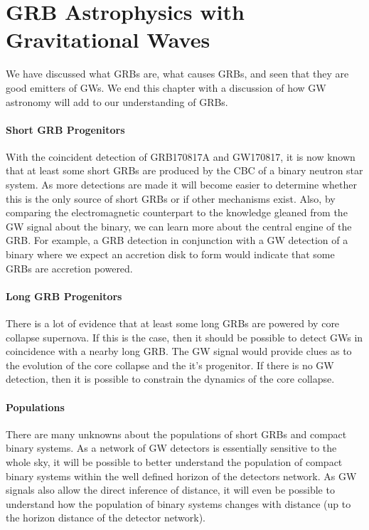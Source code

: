 \documentclass[11pt]{cuthesis}
\begin{document}
\section{GRB Astrophysics with Gravitational Waves}
We have discussed what GRBs are, what causes GRBs, and seen that they are good emitters of GWs. We end this chapter with a discussion of how GW astronomy will add to our understanding of GRBs. 

\paragraph{Short GRB Progenitors}
With the coincident detection of GRB170817A and GW170817, it is now known that at least some short GRBs are produced by the CBC of a binary neutron star system. As more detections are made it will become easier to determine whether this is the only source of short GRBs or if other mechanisms exist. Also, by comparing the electromagnetic counterpart to the knowledge gleaned from the GW signal about the binary, we can learn more about the central engine of the GRB. For example, a GRB detection in conjunction with a GW detection of a binary where we expect an accretion disk to form would indicate that some GRBs are accretion powered. 

\paragraph{Long GRB Progenitors}
There is a lot of evidence that at least some long GRBs are powered by core collapse supernova. If this is the case, then it should be possible to detect GWs in coincidence with a nearby long GRB. The GW signal would provide clues as to the evolution of the core collapse and the it's progenitor. If there is no GW detection, then it is possible to constrain the dynamics of the core collapse. 

\paragraph{Populations}
There are many unknowns about the populations of short GRBs and compact binary systems. As a network of GW detectors is essentially sensitive to the whole sky, it will be possible to better understand the population of compact binary systems within the well defined horizon of the detectors network. As GW signals also allow the direct inference of distance, it will even be possible to understand how the population of binary systems changes with distance (up to the horizon distance of the detector network). 
\end{document}
